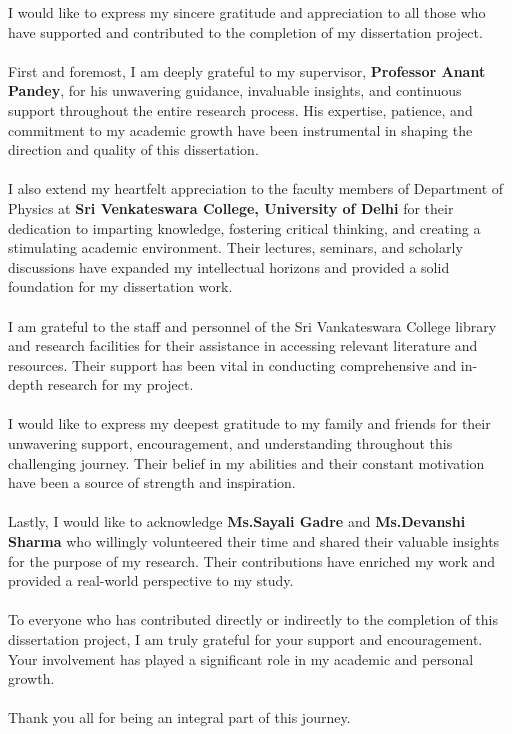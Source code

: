 \documentclass[../Report.tex]{subfiles}
\begin{document}
    \vspace{1cm}
    \large
    I would like to express my sincere gratitude and appreciation to all those who have supported and 
    contributed to the completion of my dissertation project.
    \\~\\
    \noindent First and foremost, I am deeply grateful to my supervisor, \textbf{Professor Anant Pandey}, for his 
    unwavering guidance, invaluable insights, and continuous support throughout the entire research process. 
    His expertise, patience, and commitment to my academic growth have been instrumental in shaping the direction 
    and quality of this dissertation.
    \\~\\
    \noindent I also extend my heartfelt appreciation to the faculty members of Department of Physics at 
    \textbf{Sri Venkateswara College, University of Delhi} for their dedication to imparting knowledge, 
    fostering critical thinking, and creating a stimulating academic environment. Their lectures, seminars, and 
    scholarly discussions have expanded my intellectual horizons and provided a solid foundation for my 
    dissertation work.
    \\~\\
    \noindent 
    I am grateful to the staff and personnel of the Sri Vankateswara College library and research facilities for their 
    assistance in accessing relevant literature and resources. Their support has been vital in conducting 
    comprehensive and in-depth research for my project.
    \\~\\
    \noindent 
    I would like to express my deepest gratitude to my family and friends for their unwavering support, 
    encouragement, and understanding throughout this challenging journey. Their belief in my abilities and their 
    constant motivation have been a source of strength and inspiration.
    \\~\\
    \noindent 
    Lastly, I would like to acknowledge \textbf{Ms.Sayali Gadre} and \textbf{Ms.Devanshi Sharma} who willingly 
    volunteered their time and shared their valuable insights for the purpose of my research. Their contributions 
    have enriched my work and provided a real-world perspective to my study.
    \\~\\
    \noindent 
    To everyone who has contributed directly or indirectly to the completion of this dissertation project, I am 
    truly grateful for your support and encouragement. Your involvement has played a significant role in my 
    academic and personal growth.
    \\~\\
    \noindent 
    Thank you all for being an integral part of this journey.
\end{document}
